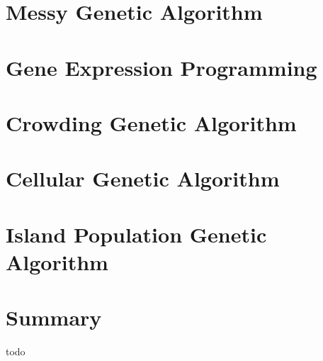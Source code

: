 \section{Messy Genetic Algorithm}

\section{Gene Expression Programming}
\section{Crowding Genetic Algorithm}
\section{Cellular Genetic Algorithm}
\section{Island Population Genetic Algorithm}

\section{Summary}
todo
